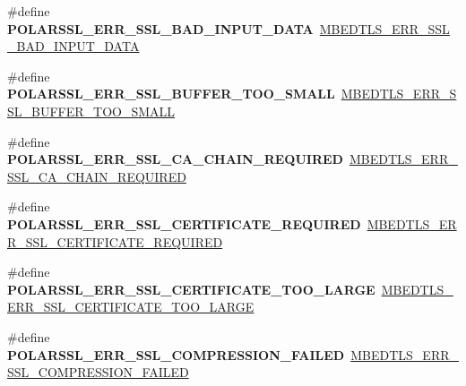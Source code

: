 \begin{DoxyCompactItemize}
\#define {\bfseries P\+O\+L\+A\+R\+S\+S\+L\+\_\+\+E\+R\+R\+\_\+\+S\+S\+L\+\_\+\+B\+A\+D\+\_\+\+I\+N\+P\+U\+T\+\_\+\+D\+A\+TA}~\mbox{\hyperlink{ssl_8h_a665997e4474e4ce0db5ef408c9c6b5ce}{M\+B\+E\+D\+T\+L\+S\+\_\+\+E\+R\+R\+\_\+\+S\+S\+L\+\_\+\+B\+A\+D\+\_\+\+I\+N\+P\+U\+T\+\_\+\+D\+A\+TA}}
\item 
\mbox{\label{compat-1_83_8h_af836572c0fb90e970c8a139867b99023}} 
\#define {\bfseries P\+O\+L\+A\+R\+S\+S\+L\+\_\+\+E\+R\+R\+\_\+\+S\+S\+L\+\_\+\+B\+U\+F\+F\+E\+R\+\_\+\+T\+O\+O\+\_\+\+S\+M\+A\+LL}~\mbox{\hyperlink{ssl_8h_ad7215c366f66035c9b5a60918168e950}{M\+B\+E\+D\+T\+L\+S\+\_\+\+E\+R\+R\+\_\+\+S\+S\+L\+\_\+\+B\+U\+F\+F\+E\+R\+\_\+\+T\+O\+O\+\_\+\+S\+M\+A\+LL}}
\item 
\mbox{\label{compat-1_83_8h_a8ca3ab1629e09f0d370e14ad11be523d}} 
\#define {\bfseries P\+O\+L\+A\+R\+S\+S\+L\+\_\+\+E\+R\+R\+\_\+\+S\+S\+L\+\_\+\+C\+A\+\_\+\+C\+H\+A\+I\+N\+\_\+\+R\+E\+Q\+U\+I\+R\+ED}~\mbox{\hyperlink{ssl_8h_a31bcc2bfd103177e3e76e04219e0497f}{M\+B\+E\+D\+T\+L\+S\+\_\+\+E\+R\+R\+\_\+\+S\+S\+L\+\_\+\+C\+A\+\_\+\+C\+H\+A\+I\+N\+\_\+\+R\+E\+Q\+U\+I\+R\+ED}}
\item 
\mbox{\label{compat-1_83_8h_aec0313a3fa877e3a3684756d2577d2b4}} 
\#define {\bfseries P\+O\+L\+A\+R\+S\+S\+L\+\_\+\+E\+R\+R\+\_\+\+S\+S\+L\+\_\+\+C\+E\+R\+T\+I\+F\+I\+C\+A\+T\+E\+\_\+\+R\+E\+Q\+U\+I\+R\+ED}~\mbox{\hyperlink{ssl_8h_accee747c38c056e6bf1271b718b562dc}{M\+B\+E\+D\+T\+L\+S\+\_\+\+E\+R\+R\+\_\+\+S\+S\+L\+\_\+\+C\+E\+R\+T\+I\+F\+I\+C\+A\+T\+E\+\_\+\+R\+E\+Q\+U\+I\+R\+ED}}
\item 
\mbox{\label{compat-1_83_8h_ad5db026d994cb67ac466c9181f380be0}} 
\#define {\bfseries P\+O\+L\+A\+R\+S\+S\+L\+\_\+\+E\+R\+R\+\_\+\+S\+S\+L\+\_\+\+C\+E\+R\+T\+I\+F\+I\+C\+A\+T\+E\+\_\+\+T\+O\+O\+\_\+\+L\+A\+R\+GE}~\mbox{\hyperlink{ssl_8h_a654b5a02c3e99f08306fdaceef5a4969}{M\+B\+E\+D\+T\+L\+S\+\_\+\+E\+R\+R\+\_\+\+S\+S\+L\+\_\+\+C\+E\+R\+T\+I\+F\+I\+C\+A\+T\+E\+\_\+\+T\+O\+O\+\_\+\+L\+A\+R\+GE}}
\item 
\mbox{\label{compat-1_83_8h_a90a14481136649c0a89a7ca5fa4eb750}} 
\#define {\bfseries P\+O\+L\+A\+R\+S\+S\+L\+\_\+\+E\+R\+R\+\_\+\+S\+S\+L\+\_\+\+C\+O\+M\+P\+R\+E\+S\+S\+I\+O\+N\+\_\+\+F\+A\+I\+L\+ED}~\mbox{\hyperlink{ssl_8h_a241d50351ffe9edeef80469a99592510}{M\+B\+E\+D\+T\+L\+S\+\_\+\+E\+R\+R\+\_\+\+S\+S\+L\+\_\+\+C\+O\+M\+P\+R\+E\+S\+S\+I\+O\+N\+\_\+\+F\+A\+I\+L\+ED}}

\end{DoxyCompactItemize}
